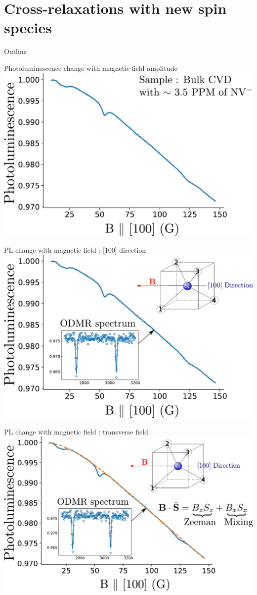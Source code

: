 \documentclass{beamer}
\begin{document}
\section{Cross-relaxations with new spin species}
\begin{frame}{Outline}
\tableofcontents[currentsection]
\end{frame}
\begin{frame}{Photoluminescence change with magnetic field amplitude}
\includegraphics[scale=.62]{Scan_100_0}
\end{frame}
\begin{frame}{PL change with magnetic field : [100] direction}%
\includegraphics[scale=.62]{Scan_100_1}
\end{frame}
\begin{frame}{PL change with magnetic field : transverse field}
\includegraphics[scale=.62]{Scan_100_2}
\end{frame}
\end{document}
